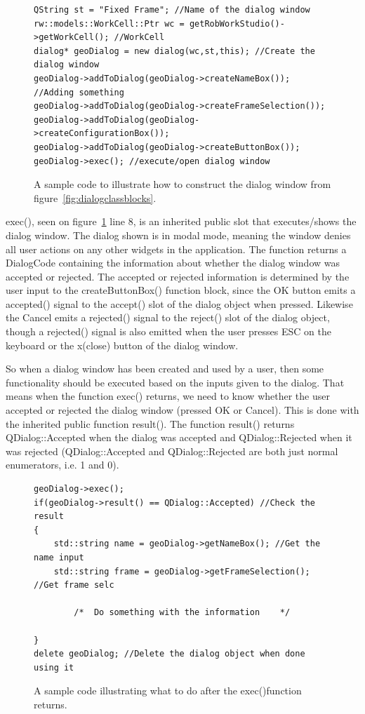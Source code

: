 \begin{figure}[h]
\centering
\lstset{language=C++} 
\begin{lstlisting}[frame=single]  
QString st = "Fixed Frame"; //Name of the dialog window
rw::models::WorkCell::Ptr wc = getRobWorkStudio()->getWorkCell(); //WorkCell
dialog* geoDialog = new dialog(wc,st,this); //Create the dialog window
geoDialog->addToDialog(geoDialog->createNameBox()); //Adding something
geoDialog->addToDialog(geoDialog->createFrameSelection());
geoDialog->addToDialog(geoDialog->createConfigurationBox());
geoDialog->addToDialog(geoDialog->createButtonBox());	
geoDialog->exec(); //execute/open dialog window	 
\end{lstlisting}
\caption{A sample code to illustrate how to construct the dialog window from figure~\ref{fig:dialogclassblocks}.}
\label{fig:dialogWindowCode} 	
\end{figure}

exec(), seen on figure~\ref{fig:dialogWindowCode} line 8, is an inherited public slot that executes/shows the dialog window. The dialog shown is in modal mode, meaning the window denies all user actions on any other widgets in the application. The function returns a DialogCode containing the information about whether the dialog window was accepted or rejected. The accepted or rejected information is determined by the user input to the createButtonBox() function block, since the OK button emits a accepted() signal to the accept() slot of the dialog object when pressed. Likewise the Cancel emits a rejected() signal to the reject() slot of the dialog object, though a rejected() signal is also emitted when the user presses ESC on the keyboard or the x(close) button of the dialog window.

So when a dialog window has been created and used by a user, then some functionality should be executed based on the inputs given to the dialog. That means when the function exec() returns, we need to know whether the user accepted or rejected the dialog window (pressed OK or Cancel). This is done with the inherited public function result(). The function result() returns QDialog::Accepted when the dialog was accepted and QDialog::Rejected when it was rejected (QDialog::Accepted and QDialog::Rejected are both just normal enumerators, i.e. 1 and 0). 

\begin{figure}[h]
\centering
\lstset{language=C++} 
\begin{lstlisting}[frame=single]  
geoDialog->exec();
if(geoDialog->result() == QDialog::Accepted) //Check the result
{
	std::string name = geoDialog->getNameBox(); //Get the name input
	std::string frame = geoDialog->getFrameSelection(); //Get frame selc
											 
		/*	Do something with the information    */ 
		
}
delete geoDialog; //Delete the dialog object when done using it
\end{lstlisting}
\caption{A sample code illustrating what to do after the exec()function returns.}
\label{fig:dialogAcceptedRejectedCode} 	
\end{figure}

